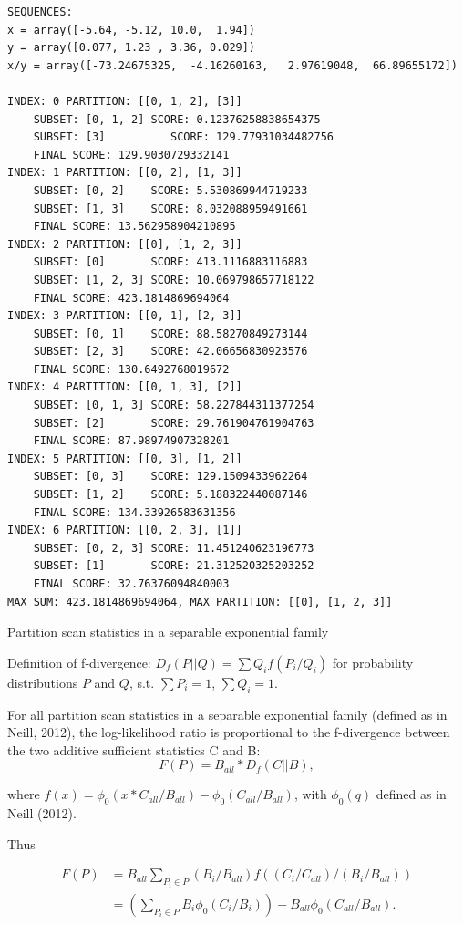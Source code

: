 \documentclass{article}
\theoremstyle{case}
\begin{document}
\begin{verbatim}
SEQUENCES:
x = array([-5.64, -5.12, 10.0,  1.94])
y = array([0.077, 1.23 , 3.36, 0.029])
x/y = array([-73.24675325,  -4.16260163,   2.97619048,  66.89655172])

INDEX: 0 PARTITION: [[0, 1, 2], [3]]
    SUBSET: [0, 1, 2] SCORE: 0.12376258838654375
    SUBSET: [3] 		 SCORE: 129.77931034482756
    FINAL SCORE: 129.9030729332141
INDEX: 1 PARTITION: [[0, 2], [1, 3]]
    SUBSET: [0, 2]    SCORE: 5.530869944719233
    SUBSET: [1, 3]    SCORE: 8.032088959491661
    FINAL SCORE: 13.562958904210895
INDEX: 2 PARTITION: [[0], [1, 2, 3]]
	SUBSET: [0]       SCORE: 413.1116883116883
    SUBSET: [1, 2, 3] SCORE: 10.069798657718122
    FINAL SCORE: 423.1814869694064
INDEX: 3 PARTITION: [[0, 1], [2, 3]]
    SUBSET: [0, 1]    SCORE: 88.58270849273144
    SUBSET: [2, 3]    SCORE: 42.06656830923576
    FINAL SCORE: 130.6492768019672
INDEX: 4 PARTITION: [[0, 1, 3], [2]]
    SUBSET: [0, 1, 3] SCORE: 58.227844311377254
    SUBSET: [2]       SCORE: 29.761904761904763
    FINAL SCORE: 87.98974907328201
INDEX: 5 PARTITION: [[0, 3], [1, 2]]
    SUBSET: [0, 3]    SCORE: 129.1509433962264
    SUBSET: [1, 2]    SCORE: 5.188322440087146
    FINAL SCORE: 134.33926583631356
INDEX: 6 PARTITION: [[0, 2, 3], [1]]
    SUBSET: [0, 2, 3] SCORE: 11.451240623196773
    SUBSET: [1]       SCORE: 21.312520325203252
    FINAL SCORE: 32.76376094840003
MAX_SUM: 423.1814869694064, MAX_PARTITION: [[0], [1, 2, 3]]

\end{verbatim}

Partition scan statistics in a separable exponential family

Definition of f-divergence: $D_f(P || Q) = \sum Q_i f(P_i / Q_i)$ for probability distributions $P$ and $Q$, s.t. $\sum P_i = 1$, $\sum Q_i = 1$.

For all partition scan statistics in a separable exponential family (defined as in Neill, 2012), the log-likelihood ratio is proportional to the f-divergence between the two additive sufficient statistics C and B:
\[
F(P) = B_{all}*D_f(C || B),
\]

where $f(x) = \phi_0(x*C_{all}/B_{all}) - \phi_0(C_{all}/B_{all})$, with $\phi_0(q)$ defined as in Neill (2012).


Thus 

\begin{align*}
F(P) &= B_{all} \sum_{P_i \in P} (B_i/B_{all}) f((C_i/C_{all})/(B_i/B_{all})) \\
&= (\sum_{P_i \in P} B_i \phi_0(C_i/B_i)) - B_{all} \phi_0(C_{all}/B_{all}).
\end{align*}
\end{document}
